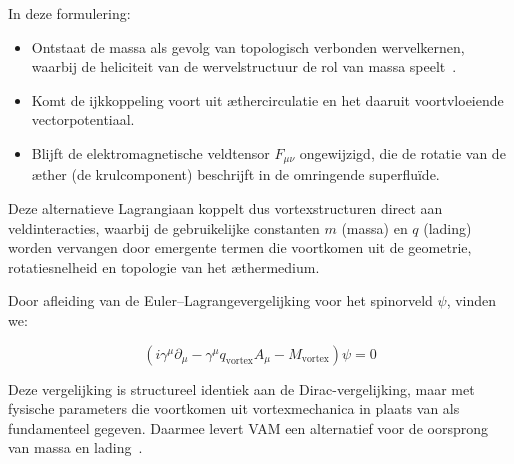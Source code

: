 In deze formulering:

\begin{itemize}
    \item Ontstaat de massa als gevolg van topologisch verbonden wervelkernen, waarbij de heliciteit van de wervelstructuur de rol van massa speelt~\cite{Volovik2003}.
    \item Komt de ijkkoppeling voort uit æthercirculatie en het daaruit voortvloeiende vectorpotentiaal.
    \item Blijft de elektromagnetische veldtensor \( F_{\mu\nu} \) ongewijzigd, die de rotatie van de æther (de krulcomponent) beschrijft in de omringende superfluïde.
\end{itemize}

Deze alternatieve Lagrangiaan koppelt dus vortexstructuren direct aan veldinteracties, waarbij de gebruikelijke constanten \( m \) (massa) en \( q \) (lading) worden vervangen door emergente termen die voortkomen uit de geometrie, rotatiesnelheid en topologie van het æthermedium.

Door afleiding van de Euler–Lagrangevergelijking voor het spinorveld \( \psi \), vinden we:

\begin{equation}
    \boxed{ \left( i \gamma^\mu \partial_\mu - \gamma^\mu q_{\text{vortex}} A_\mu - M_{\text{vortex}} \right)\psi = 0 }
\end{equation}

Deze vergelijking is structureel identiek aan de Dirac-vergelijking, maar met fysische parameters die voortkomen uit vortexmechanica in plaats van als fundamenteel gegeven. Daarmee levert VAM een alternatief voor de oorsprong van massa en lading~\cite{Barcelo2011,Volovik2003}.
